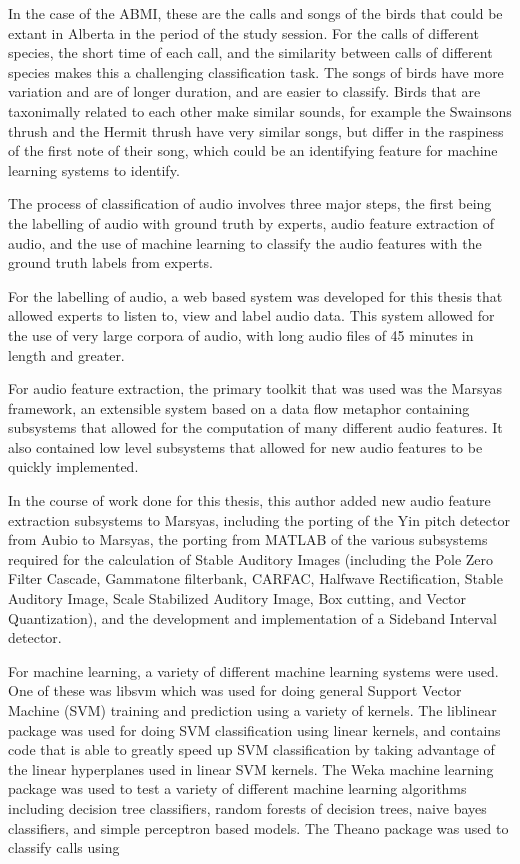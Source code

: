 \documentclass[12pt,oneside]{book}
\begin{document}
In the case of the ABMI, these are the calls and songs of the birds
that could be extant in Alberta in the period of the study session.
For the calls of different species, the short time of each call, and
the similarity between calls of different species makes this a
challenging classification task.  The songs of birds have more
variation and are of longer duration, and are easier to classify.
Birds that are taxonimally related to each other make similar sounds,
for example the Swainsons thrush and the Hermit thrush have very
similar songs, but differ in the raspiness of the first note of their
song, which could be an identifying feature for machine learning
systems to identify.  

The process of classification of audio involves three major steps, the
first being the labelling of audio with ground truth by experts, audio
feature extraction of audio, and the use of machine learning to
classify the audio features with the ground truth labels from
experts.  

For the labelling of audio, a web based system was developed for this
thesis that allowed experts to listen to, view and label audio data.
This system allowed for the use of very large corpora of audio, with
long audio files of 45 minutes in length and greater.


For audio feature extraction, the primary toolkit that was used was
the Marsyas \cite{marsyas} framework, an extensible system based on a
data flow metaphor containing subsystems that allowed for the
computation of many different audio features.  It also contained low
level subsystems that allowed for new audio features to be quickly
implemented.

In the course of work done for this thesis, this author added new
audio feature extraction subsystems to Marsyas, including the porting
of the Yin pitch detector from Aubio to Marsyas, the porting from
MATLAB of the various subsystems required for the calculation of
Stable Auditory Images (including the Pole Zero Filter Cascade,
Gammatone filterbank, CARFAC, Halfwave Rectification, Stable Auditory
Image, Scale Stabilized Auditory Image, Box cutting, and Vector
Quantization), and the development and implementation of a Sideband
Interval detector.

For machine learning, a variety of different machine learning systems
were used.  One of these was libsvm \cite{libsvm} which was used for
doing general Support Vector Machine (SVM) training and prediction
using a variety of kernels.  The liblinear \cite{liblinear} package
was used for doing SVM classification using linear kernels, and
contains code that is able to greatly speed up SVM classification by
taking advantage of the linear hyperplanes used in linear SVM kernels.
The Weka machine learning package \cite{weka} was used to test a
variety of different machine learning algorithms including decision
tree classifiers, random forests of decision trees, naive bayes
classifiers, and simple perceptron based models.  The Theano package
\cite{theano} was used to classify calls using 
\end{document}
